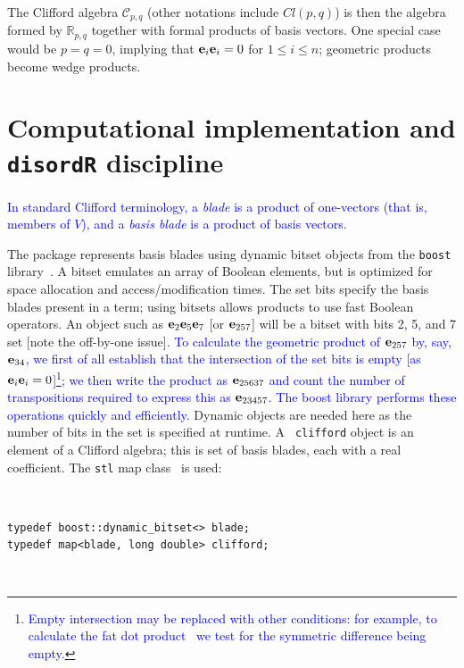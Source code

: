 \documentclass{birkjour}
\theoremstyle{definition}
\theoremstyle{remark}
\numberwithin{equation}{section}
\begin{document}
The Clifford algebra ${\mathcal C}_{p,q}$ (other notations include
$Cl(p,q)$) is then the algebra formed by $\mathbb{R}_{p,q}$ together
with formal products of basis vectors.  One special case would be
$p=q=0$, implying that ${\bf e}_{i}{\bf e}_{i}=0$ for $1\leqslant i\leqslant n$;
geometric products become wedge products.

\section{Computational implementation and {\tt disordR} discipline}

\textcolor{blue}{ In standard Clifford terminology, a {\em blade} is a
  product of one-vectors (that is, members of $V$), and a {\em basis
    blade} is a product of basis vectors.}

The package represents basis blades using dynamic bitset objects from
the {\tt boost} library~\textcolor{blue}{\cite{karlsson2005}}.  A
bitset emulates an array of Boolean elements, but is optimized for
space allocation and access/modification times.  The set bits specify
the basis blades present in a term; using bitsets allows products to
use fast Boolean operators.  An object such as ${\bf e}_{2}{\bf e}_{5}{\bf e}_{7}$
[or ${\bf e}_{257}$] will be a bitset with bits 2, 5, and 7 set [note the
  off-by-one issue].  \textcolor{blue}{To calculate the geometric
  product of ${\bf e}_{257}$ by, say, ${\bf e}_{34}$, we first of all establish
  that the intersection of the set bits is empty [as
    ${\bf e}_{i}{\bf e}_{i}=0$]\footnote{\textcolor{blue}{Empty intersection may
    be replaced with other conditions: for example, to calculate the
    fat dot product~\cite{dorst2002} we test for the symmetric
    difference being empty.}}; we then write the product as
  ${\bf e}_{25637}$ and count the number of transpositions required to
  express this as ${\bf e}_{23457}$.  The boost library performs these
  operations quickly and efficiently.} Dynamic objects are needed here
as the number of bits in the set is specified at runtime.  A {\tt
  clifford} object is an element of a Clifford algebra; this is set of
basis blades, each with a real coefficient.  The {\tt stl} map
class~\cite{musser2009} is used:

{\ }\\[10pt]
\begin{verbatim}
typedef boost::dynamic_bitset<> blade;
typedef map<blade, long double> clifford;
\end{verbatim}

{\ }\\[10pt]
\end{document}
